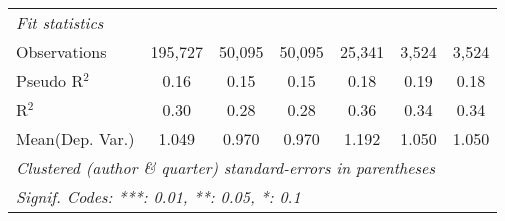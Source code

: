 \begin{tabular}{lcccccc}
   \midrule
   \emph{Fit statistics}\\
   Observations                  & 195,727       & 50,095        & 50,095        & 25,341        & 3,524   & 3,524\\  
   Pseudo R$^2$                  & 0.16          & 0.15          & 0.15          & 0.18          & 0.19    & 0.18\\  
   R$^2$                         & 0.30          & 0.28          & 0.28          & 0.36          & 0.34    & 0.34\\  
Mean(Dep. Var.) & 1.049 & 0.970 & 0.970 & 1.192 & 1.050 & 1.050 \\
   \midrule \midrule
   \multicolumn{7}{l}{\emph{Clustered (author \& quarter) standard-errors in parentheses}}\\
   \multicolumn{7}{l}{\emph{Signif. Codes: ***: 0.01, **: 0.05, *: 0.1}}\\
\end{tabular}
\par\endgroup
